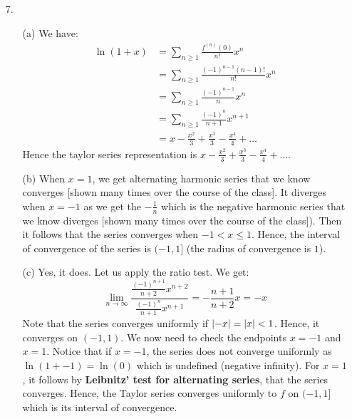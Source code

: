 \documentclass[11pt]{article}
\DeclarePairedDelimiter\abs{\lvert}{\rvert}%
\begin{document}
\begin{itemize}
    \item[7.]
        \begin{itemize}
            \item[(a)]
                We have:
                \begin{align*}
                    \ln (1 + x) &= \sum_{n \geq 1} \frac{f^{(n)} (0)}{n!} x^n\\
                                &= \sum_{n \geq 1}
                                    \frac{(-1)^{n - 1}(n - 1)!}{n!} x^n\\
                                &= \sum_{n \geq 1} \frac{(-1)^{n - 1}}{n} x^n\\
                                &= \sum_{n \geq 1} \frac{(-1)^{n}}{n + 1}
                                   x^{n + 1}\\
                                &= x - \frac{x^2}{3} + \frac{x^3}{3} -
                                       \frac{x^4}{4} + \dots
                \end{align*}
                Hence the taylor series representation is $x - \frac{x^2}{3} +
                \frac{x^3}{3} - \frac{x^4}{4} + \dots$.

            \item[(b)]
                When $x = 1$, we get alternating harmonic series that we know
                converges [shown many times over the course of the class]. It
                diverges when $x = -1$ as we get the $-\frac{1}{n}$ which is
                the negative harmonic series that we know diverges [shown many
                times over the course of the class]). Then it follows that the
                series converges when $-1 < x \leq 1$. Hence, the interval of
                convergence of the series is $(-1, 1]$ (the radius of
                convergence is $1$).

            \item[(c)]
                Yes, it does. Let us apply the ratio test. We get:
                \begin{equation*}
                    \lim_{n \to \infty} \frac{\frac{(-1)^{n + 1}}{n + 2} x^{n +
                    2}}{\frac{(-1)^{n}}{n + 1} x^{n + 1}} = -\frac{n + 1}{n +
                    2} x = -x
                \end{equation*}
                Note that the series converges uniformly if $\abs{-x} = \abs{x}
                < 1$. Hence, it converges on $(-1, 1)$. We now need to check
                the endpoints $x = -1$ and $x = 1$. Notice that if $x = -1$,
                the series does not converge uniformly as $\ln (1 + -1) = \ln
                (0)$ which is undefined (negative infinity). For $x = 1$, it
                follows by \textbf{Leibnitz’ test for alternating series}, that
                the series converges. Hence, the Taylor series converges
                uniformly to $f$ on $(-1, 1]$ which is its interval of
                convergence.
        \end{itemize}
\end{itemize}

\end{document}
